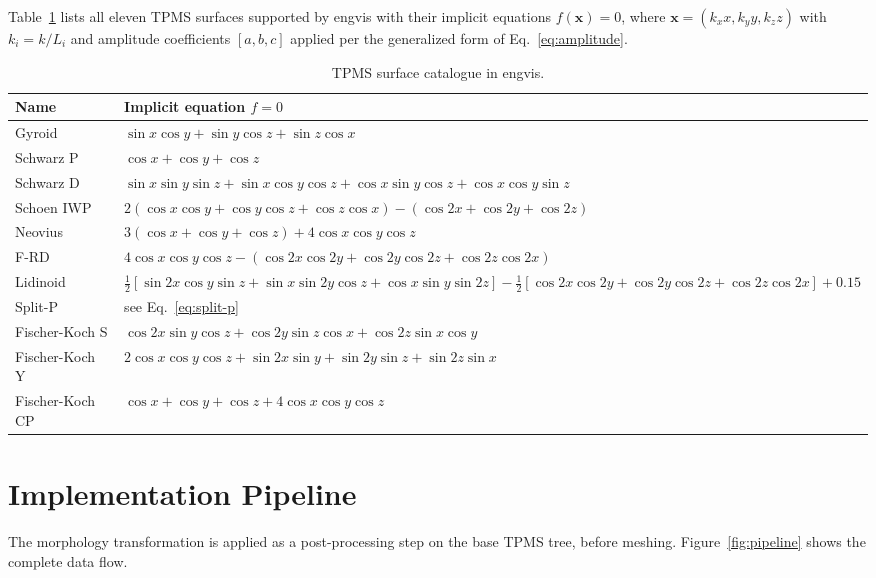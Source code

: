 \documentclass[11pt]{article}
\begin{document}
Table~\ref{tab:catalogue} lists all eleven TPMS surfaces supported by
engvis with their implicit equations $f(\mathbf{x}) = 0$, where
$\mathbf{x} = (k_x x, k_y y, k_z z)$ with $k_i = k/L_i$ and amplitude
coefficients $[a,b,c]$ applied per the generalized form of
Eq.~\eqref{eq:amplitude}.

\begin{table}[h]
\centering
\caption{TPMS surface catalogue in engvis.}
\label{tab:catalogue}
\small
\begin{tabular}{lp{9cm}}
\toprule
\textbf{Name} & \textbf{Implicit equation $f = 0$} \\
\midrule
Gyroid & $\sin x\cos y + \sin y\cos z + \sin z\cos x$ \\
Schwarz P & $\cos x + \cos y + \cos z$ \\
Schwarz D & $\sin x\sin y\sin z + \sin x\cos y\cos z + \cos x\sin y\cos z + \cos x\cos y\sin z$ \\
Schoen IWP & $2(\cos x\cos y + \cos y\cos z + \cos z\cos x) - (\cos 2x + \cos 2y + \cos 2z)$ \\
Neovius & $3(\cos x + \cos y + \cos z) + 4\cos x\cos y\cos z$ \\
F-RD & $4\cos x\cos y\cos z - (\cos 2x\cos 2y + \cos 2y\cos 2z + \cos 2z\cos 2x)$ \\
Lidinoid & $\tfrac{1}{2}[\sin 2x\cos y\sin z + \sin x\sin 2y\cos z + \cos x\sin y\sin 2z]
            - \tfrac{1}{2}[\cos 2x\cos 2y + \cos 2y\cos 2z + \cos 2z\cos 2x] + 0.15$ \\
Split-P & see Eq.~\eqref{eq:split-p} \\
Fischer-Koch S & $\cos 2x\sin y\cos z + \cos 2y\sin z\cos x + \cos 2z\sin x\cos y$ \\
Fischer-Koch Y & $2\cos x\cos y\cos z + \sin 2x\sin y + \sin 2y\sin z + \sin 2z\sin x$ \\
Fischer-Koch CP & $\cos x + \cos y + \cos z + 4\cos x\cos y\cos z$ \\
\bottomrule
\end{tabular}
\end{table}

\section{Implementation Pipeline}

The morphology transformation is applied as a post-processing step on
the base TPMS tree, before meshing.  Figure~\ref{fig:pipeline} shows
the complete data flow.
\end{document}
